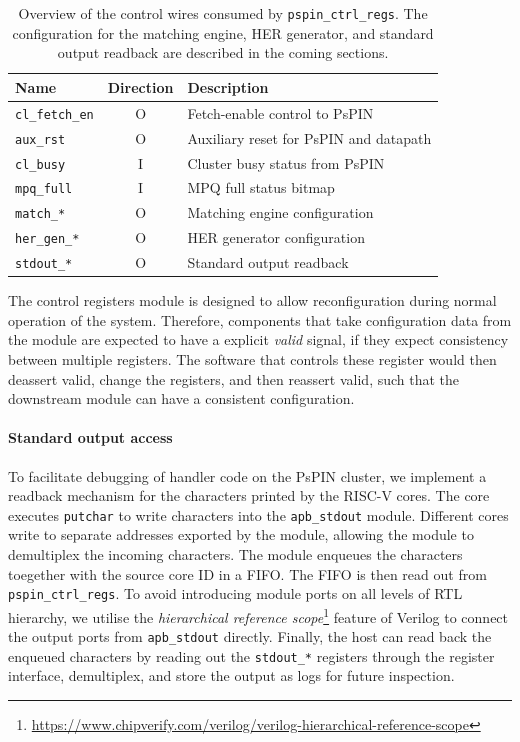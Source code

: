 \begin{table}[ht]
    \centering
    \begin{tabular}{lcl}
    \toprule
    Name & Direction & Description \\ \midrule
    \texttt{cl\_fetch\_en} & O & Fetch-enable control to PsPIN \\
    \texttt{aux\_rst} & O & Auxiliary reset for PsPIN and datapath \\
    \texttt{cl\_busy} & I & Cluster busy status from PsPIN \\
    \texttt{mpq\_full} & I & MPQ full status bitmap \\
    \texttt{match\_*} & O & Matching engine configuration \\
    \texttt{her\_gen\_*} & O & HER generator configuration \\
    \texttt{stdout\_*} & O & Standard output readback \\
    \bottomrule
    \end{tabular}
    \caption{Overview of the control wires consumed by \texttt{pspin\_ctrl\_regs}.  The configuration for the matching engine, HER generator, and standard output readback are described in the coming sections.}
    \label{tab:ctrl-signals}
\end{table}

The control registers module is designed to allow reconfiguration during normal operation of the system.  Therefore, components that take configuration data from the module are expected to have a explicit \emph{valid} signal, if they expect consistency between multiple registers.  The software that controls these register would then deassert valid, change the registers, and then reassert valid, such that the downstream module can have a consistent configuration.

\paragraph{Standard output access} To facilitate debugging of handler code on the PsPIN cluster, we implement a readback mechanism for the characters printed by the RISC-V cores.  The core executes \texttt{putchar} to write characters into the \texttt{apb\_stdout} module.  Different cores write to separate addresses exported by the module, allowing the module to demultiplex the incoming characters.  The module enqueues the characters toegether with the source core ID in a FIFO.  The FIFO is then read out from \texttt{pspin\_ctrl\_regs}.  To avoid introducing module ports on all levels of RTL hierarchy, we utilise the \emph{hierarchical reference scope}\footnote{\url{https://www.chipverify.com/verilog/verilog-hierarchical-reference-scope}} feature of Verilog to connect the output ports from \texttt{apb\_stdout} directly.  Finally, the host can read back the enqueued characters by reading out the \texttt{stdout\_*} registers through the register interface, demultiplex, and store the output as logs for future inspection.

